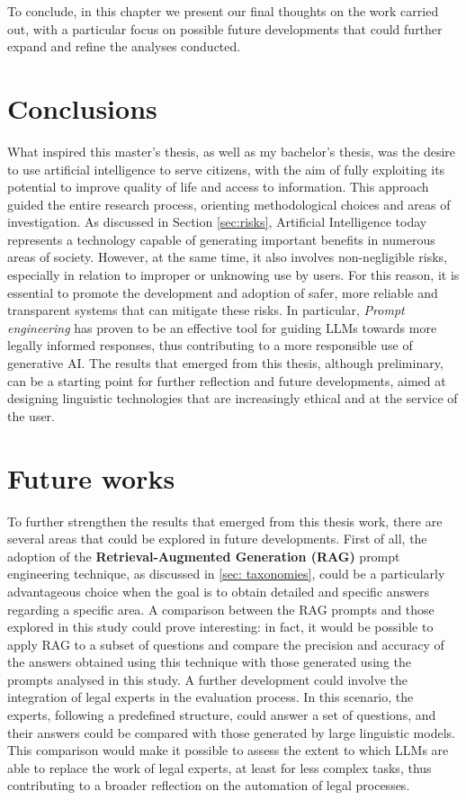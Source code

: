 To conclude, in this chapter we present our final thoughts on the work carried out, with a particular focus on possible future developments that could further expand and refine the analyses conducted.
\section{Conclusions}
What inspired this master's thesis, as well as my bachelor's thesis, was the desire to use artificial intelligence to serve citizens, with the aim of fully exploiting its potential to improve quality of life and access to information. This approach guided the entire research process, orienting methodological choices and areas of investigation.
As discussed in Section \ref{sec:risks}, Artificial Intelligence today represents a technology capable of generating important benefits in numerous areas of society. However, at the same time, it also involves non-negligible risks, especially in relation to improper or unknowing use by users.
For this reason, it is essential to promote the development and adoption of safer, more reliable and transparent systems that can mitigate these risks.
In particular, \textit{Prompt engineering} has proven to be an effective tool for guiding LLMs towards more legally informed responses, thus contributing to a more responsible use of generative AI.
The results that emerged from this thesis, although preliminary, can be a starting point for further reflection and future developments, aimed at designing linguistic technologies that are increasingly ethical and at the service of the user.
\section{Future works}
To further strengthen the results that emerged from this thesis work, there are several areas that could be explored in future developments. First of all, the adoption of the \textbf{Retrieval-Augmented Generation (RAG)} prompt engineering technique, as discussed in \ref{sec: taxonomies}, could be a particularly advantageous choice when the goal is to obtain detailed and specific answers regarding a specific area.
A comparison between the RAG prompts and those explored in this study could prove interesting: in fact, it would be possible to apply RAG to a subset of questions and compare the precision and accuracy of the answers obtained using this technique with those generated using the prompts analysed in this study.
A further development could involve the integration of legal experts in the evaluation process. In this scenario, the experts, following a predefined structure, could answer a set of questions, and their answers could be compared with those generated by large linguistic models. This comparison would make it possible to assess the extent to which LLMs are able to replace the work of legal experts, at least for less complex tasks, thus contributing to a broader reflection on the automation of legal processes.